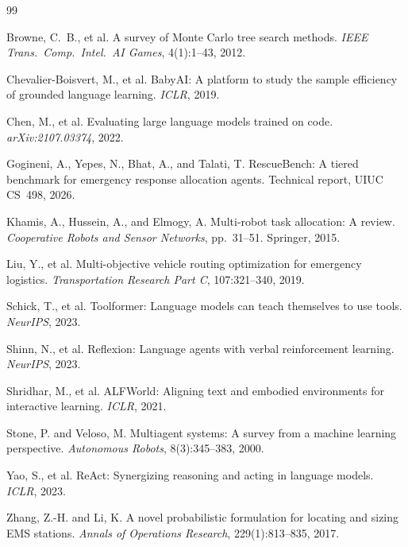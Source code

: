 \documentclass{article}
\begin{document}
\begin{thebibliography}{99}
\small

Browne, C.~B., et al.
A survey of Monte Carlo tree search methods.
\textit{IEEE Trans.\ Comp.\ Intel.\ AI Games}, 4(1):1--43, 2012.

Chevalier-Boisvert, M., et al.
BabyAI: A platform to study the sample efficiency of grounded language learning.
\textit{ICLR}, 2019.

Chen, M., et al.
Evaluating large language models trained on code.
\textit{arXiv:2107.03374}, 2022.

Gogineni, A., Yepes, N., Bhat, A., and Talati, T.
RescueBench: A tiered benchmark for emergency response allocation agents.
Technical report, UIUC CS~498, 2026.

Khamis, A., Hussein, A., and Elmogy, A.
Multi-robot task allocation: A review.
\textit{Cooperative Robots and Sensor Networks}, pp.\ 31--51. Springer, 2015.

Liu, Y., et al.
Multi-objective vehicle routing optimization for emergency logistics.
\textit{Transportation Research Part C}, 107:321--340, 2019.

Schick, T., et al.
Toolformer: Language models can teach themselves to use tools.
\textit{NeurIPS}, 2023.

Shinn, N., et al.
Reflexion: Language agents with verbal reinforcement learning.
\textit{NeurIPS}, 2023.

Shridhar, M., et al.
ALFWorld: Aligning text and embodied environments for interactive learning.
\textit{ICLR}, 2021.

Stone, P. and Veloso, M.
Multiagent systems: A survey from a machine learning perspective.
\textit{Autonomous Robots}, 8(3):345--383, 2000.

Yao, S., et al.
ReAct: Synergizing reasoning and acting in language models.
\textit{ICLR}, 2023.

Zhang, Z.-H. and Li, K.
A novel probabilistic formulation for locating and sizing EMS stations.
\textit{Annals of Operations Research}, 229(1):813--835, 2017.

\end{thebibliography}
\end{document}
